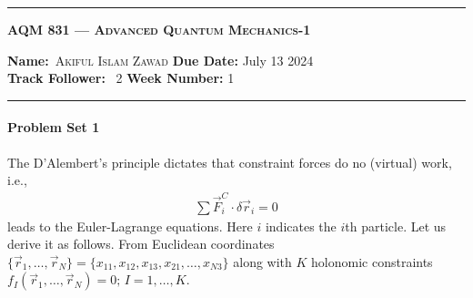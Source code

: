 \begin{center}
	\hrule
	\vspace{.4cm}
	\Large\scshape\textbf{AQM 831 --- Advanced Quantum Mechanics-1}
\end{center}
{\textbf{Name:}\ \textsc{Akiful Islam Zawad} \hspace{\hfill} \textbf{Due Date:} July 13 2024\\[5pt]
{ \textbf{Track Follower:}} \ 2 \hspace{\hfill} \textbf{Week Number:} 1 \\
	\hrule}
\paragraph*{Problem Set 1} %
The D'Alembert’s principle dictates that constraint forces do no (virtual) work, i.e.,
\begin{align*}
    \sum \vec{F}_i^C \cdot \delta \vec{r}_i = 0
\end{align*}
leads to the Euler-Lagrange equations. Here $i$ indicates the $i$th particle. Let us derive it as follows. From Euclidean coordinates $\{\vec{r}_1, \ldots, \vec{r}_N\} = \{x_{11}, x_{12}, x_{13}, x_{21}, \ldots, x_{N3}\}$ along with $K$ holonomic constraints\\ $\displaystyle f_I(\vec{r}_1, \ldots, \vec{r}_N) = 0; \, I = 1, \ldots, K$.

